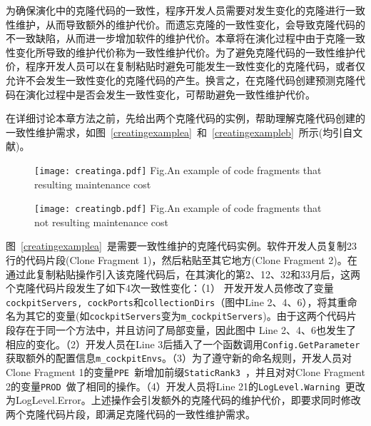 为确保演化中的克隆代码的一致性，程序开发人员需要对发生变化的克隆进行一致性维护，从而导致额外的维护代价。而遗忘克隆的一致性变化，会导致克隆代码的不一致缺陷，从而进一步增加软件的维护代价\cite{aversano2007clones}\cite{bettenburg2009empirical}。本章将在演化过程中由于克隆一致性变化所导致的维护代价称为一致性维护代价。为了避免克隆代码的一致性维护代价，程序开发人员可以在复制粘贴时避免可能发生一致性变化的克隆代码，或者仅允许不会发生一致性变化的克隆代码的产生。换言之，在克隆代码创建预测克隆代码在演化过程中是否会发生一致性变化，可帮助避免一致性维护代价。

在详细讨论本章方法之前，先给出两个克隆代码的实例，帮助理解克隆代码创建的一致性维护需求，如图~\ref{creatingexamplea}~和~\ref{creatingexampleb}~所示(均引自文献\cite{wang2014predicting})。

\begin{figure}[htbp]
\centering
\texttt{[image: creatinga.pdf]}
{Fig.$\!$}{An example of code fragments that resulting maintenance cost}
\vspace{-1em}
\end{figure}

\begin{figure}[htbp]
\centering
\texttt{[image: creatingb.pdf]}
{Fig.$\!$}{An example of code fragments that not resulting maintenance cost}
\vspace{-1em}
\end{figure}

图~\ref{creatingexamplea}~是需要一致性维护的克隆代码实例。软件开发人员复制23行的代码片段(Clone Fragment 1)，然后粘贴至其它地方(Clone Fragment 2)。在通过此复制粘贴操作引入该克隆代码后，在其演化的第2、12、32和33月后，这两个克隆代码片段发生了如下4次一致性变化：（1） 开发开发人员修改了变量{\tt cockpitServers, cockPorts\/}和{\tt collectionDirs}（图中Line 2、4、6），将其重命名为其它的变量(如{\tt cockpitServers\/}变为{\tt m\_cockpitServers\/})。由于这两个代码片段存在于同一个方法中，并且访问了局部变量，因此图中 Line 2、4、6也发生了相应的变化。（2）开发人员在Line 3后插入了一个函数调用{\tt Config.GetParameter\/}获取额外的配置信息{\tt m\_cockpitEnvs\/}。（3）为了遵守新的命名规则，开发人员对Clone Fragment 1的变量{\tt PPE \/}新增加前缀{\tt StaticRank3 \/}，并且对对Clone Fragment 2的变量{\tt PROD \/}做了相同的操作。（4）开发人员将Line 21的{\tt LogLevel.Warning \/}更改为{LogLevel.Error\/}。上述操作会引发额外的克隆代码的维护代价，即要求同时修改两个克隆代码片段，即满足克隆代码的一致性维护需求。

